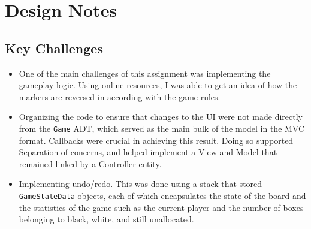 \documentclass[11pt,letterpaper]{article}
\begin{document}
\section{Design Notes}
\subsection{Key Challenges}
\begin{itemize}
\item One of the main challenges of this assignment was implementing the gameplay logic. Using online resources, I was able to get an idea of how the markers are reversed in according with the game rules.
\item Organizing the code to ensure that changes to the UI were not made directly from the \texttt{Game} ADT, which served as the main bulk of the model in the MVC format. Callbacks were crucial in achieving this result. Doing so supported Separation of concerns, and helped implement a View and Model that remained linked by a Controller entity.
\item Implementing undo/redo. This was done using a stack that stored \texttt{GameStateData} objects, each of which encapsulates the state of the board and the statistics of the game such as the current player and the number of boxes belonging to black, white, and still unallocated. 
\end{itemize}
\end{document}
